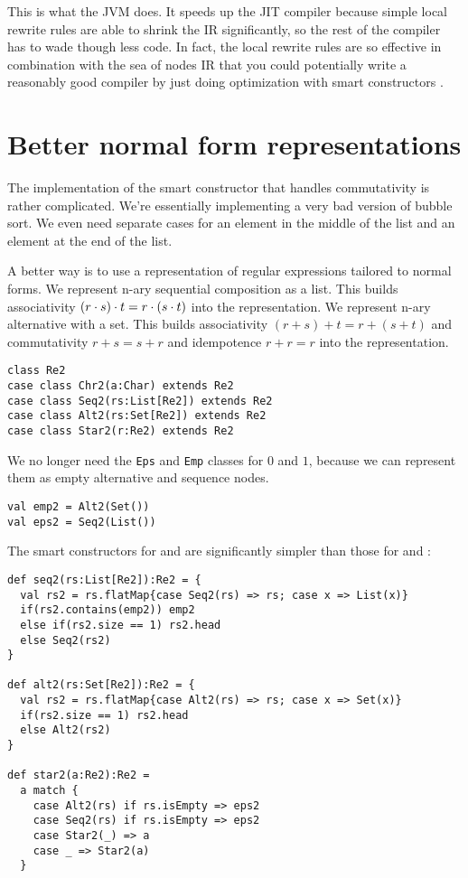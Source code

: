 This is what the JVM does. It speeds up the JIT compiler because simple local rewrite rules are able to shrink the IR significantly, so the rest of the compiler has to wade though less code. In fact, the local rewrite rules are so effective in combination with the sea of nodes IR that you could potentially write a reasonably good compiler by just doing optimization with smart constructors \cite{click95}.


\section{Better normal form representations}

The implementation of the smart constructor that handles commutativity is rather complicated. We're essentially implementing a very bad version of bubble sort. We even need separate cases for an element in the middle of the list and an element at the end of the list.

A better way is to use a representation of regular expressions tailored to normal forms. We represent n-ary sequential composition as a list. This builds associativity $(r \cdot s) \cdot t = r \cdot (s \cdot t)$ into the representation. We represent n-ary alternative with a set. This builds associativity $(r + s) + t = r + (s + t)$ and commutativity $r + s = s + r$ and idempotence $r + r = r$ into the representation.

\begin{lstlisting}
class Re2
case class Chr2(a:Char) extends Re2
case class Seq2(rs:List[Re2]) extends Re2
case class Alt2(rs:Set[Re2]) extends Re2
case class Star2(r:Re2) extends Re2
\end{lstlisting}

We no longer need the \lstinline|Eps| and \lstinline|Emp| classes for $0$ and $1$, because we can represent them as empty alternative and sequence nodes.

\begin{lstlisting}
val emp2 = Alt2(Set())
val eps2 = Seq2(List())
\end{lstlisting}

The smart constructors for  and  are significantly simpler than those for  and :

\begin{lstlisting}
def seq2(rs:List[Re2]):Re2 = {
  val rs2 = rs.flatMap{case Seq2(rs) => rs; case x => List(x)}
  if(rs2.contains(emp2)) emp2
  else if(rs2.size == 1) rs2.head
  else Seq2(rs2)
}

def alt2(rs:Set[Re2]):Re2 = {
  val rs2 = rs.flatMap{case Alt2(rs) => rs; case x => Set(x)}
  if(rs2.size == 1) rs2.head
  else Alt2(rs2)
}

def star2(a:Re2):Re2 =
  a match {
    case Alt2(rs) if rs.isEmpty => eps2
    case Seq2(rs) if rs.isEmpty => eps2
    case Star2(_) => a
    case _ => Star2(a)
  }
\end{lstlisting}

